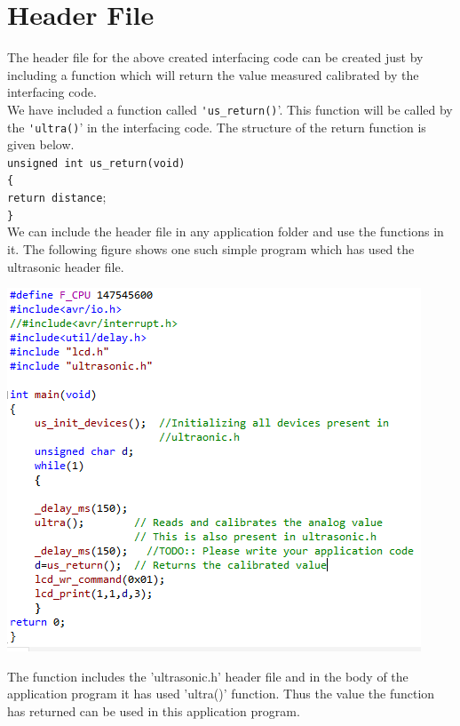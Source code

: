 \documentclass[a4paper,29.6pt]{article}
\begin{document}
\section{Header File}
\begin{small}
	The header file for the above created interfacing code can be created just by including a function which will return the value measured calibrated by the interfacing code.\\
	We have included a function called  \verb"'us_return()"'. This function will be called by the \verb"'ultra()"' in the interfacing code. The structure of the return function is given below.\\
	\verb"unsigned int us_return(void)"\\
\verb"{"\\
	\verb"return distance";\\
\verb"}"\\
	We can include the header file in any application folder and use the functions in it. The following figure shows one such simple program which has used the ultrasonic header file. \\ 
\begin{center}
\includegraphics[scale=0.75]{app2}
\end{center}
	The function includes the 'ultrasonic.h' header file and in the body of the application program it has used 'ultra()' function. Thus the value the function has returned can be used in this application program.
\end{small}
\end{document}
